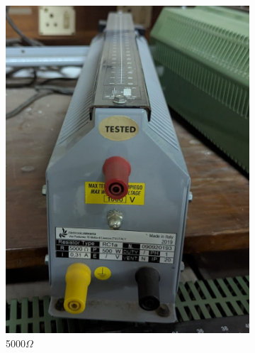 \documentclass[a4paper,12pt]{article}
\begin{document}
	\begin{figure}[H]
		\centering
		\begin{subfigure}[t]{.3\textwidth}
			\centering
			\includegraphics[width=.9\linewidth]{Images/10}
			\caption{ 5000$\Omega$ }
			\vspace{0.1cm}
		\end{subfigure}
		\hfill
		\begin{subfigure}[t]{.3\textwidth}
			\centering

\end{subfigure}
\end{figure}
\end{document}
